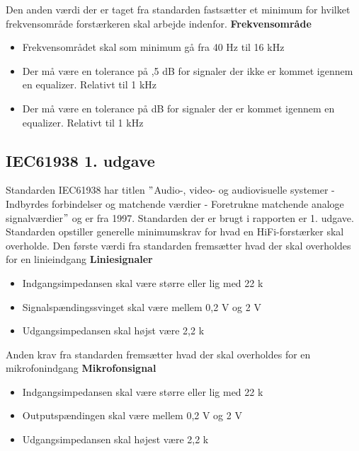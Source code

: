 Den anden værdi der er taget fra standarden fastsætter et minimum for hvilket frekvensområde forstærkeren skal arbejde indenfor.
\newline 
\newline
\textbf{Frekvensområde}
\begin{itemize}
\item Frekvensområdet skal som minimum gå fra 40 Hz til 16 kHz
\item Der må være en tolerance på ,5 dB for signaler der ikke er kommet igennem en equalizer. Relativt til 1 kHz
\item Der må være en tolerance på  dB for signaler der er kommet igennem en equalizer. Relativt til 1 kHz
\end{itemize}


\subsection*{IEC61938 1. udgave}
\label{IEC61938}
Standarden IEC61938 har titlen $"$Audio-, video- og audiovisuelle systemer - Indbyrdes forbindelser og matchende værdier - Foretrukne matchende analoge signalværdier$"$ og er fra 1997. Standarden der er brugt i rapporten er 1. udgave. Standarden opstiller generelle minimumskrav for hvad en HiFi-forstærker skal overholde. \cite{IEC61938}%
\newline
\newline
Den første værdi fra standarden fremsætter hvad der skal overholdes for en linieindgang
\newline
\newline
\textbf{Liniesignaler}
\begin{itemize}
\item Indgangsimpedansen skal være større eller lig med 22 k\ohm
\item Signalspændingssvinget skal være mellem 0,2 V og 2 V
\item Udgangsimpedansen skal højst være 2,2 k\ohm
\end{itemize}
Anden krav fra standarden fremsætter hvad der skal overholdes for en mikrofonindgang
\newline 
\newline
\textbf{Mikrofonsignal}
\begin{itemize}
\item Indgangsimpedansen skal være større eller lig med 22 k\ohm
\item Outputspændingen skal være mellem 0,2 V og 2 V
\item Udgangsimpedansen skal højest være 2,2 k\ohm
\end{itemize}

